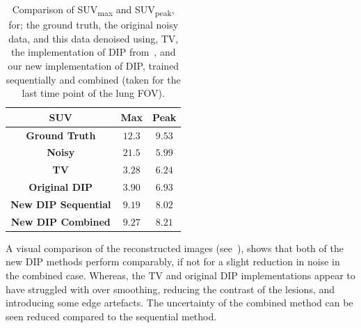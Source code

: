     \begin{table}
        
        \centering
        
        \captionsetup{singlelinecheck=false, justification=centering}
        \caption{
        Comparison of \acrshort{SUV}\textsubscript{max} and \acrshort{SUV}\textsubscript{peak}, for; the ground truth, the original noisy data, and this data denoised using, \gls{TV}, the implementation of \gls{DIP} from~\cite{Gong2019PETPrior}, and our new implementation of \gls{DIP}, trained sequentially and combined (taken for the last time point of the lung \gls{FOV}).}
        
        
        \resizebox*{1.0\linewidth}{!}
        {
            \begin{tabular}{||c|cc||}
                \hline
                \textbf{\acrshort{SUV}}             & \textbf{Max}  & \textbf{Peak} \\
                \hline
                \textbf{Ground Truth}               & $12.3$        & $9.53$ \\
                \hline
                \textbf{Noisy}                      & $21.5$        & $5.99$ \\
                \hline
                \textbf{\gls{TV}}                   & $3.28$        & $6.24$ \\
                \textbf{Original \gls{DIP}}         & $3.90$        & $6.93$ \\
                \hline
                \textbf{New \gls{DIP} Sequential}   & $9.19$        & $8.02$ \\
                \textbf{New \gls{DIP} Combined}     & $9.27$        & $8.21$ \\
                \hline
            \end{tabular}
        }
        \label{tab:suv}
        
    \end{table}
    
    A visual comparison of the reconstructed images (see~), shows that both of the new \gls{DIP} methods perform comparably, if not for a slight reduction in noise in the combined case. Whereas, the \gls{TV} and original \gls{DIP} implementations appear to have struggled with over smoothing, reducing the contrast of the lesions, and introducing some edge artefacts. The uncertainty of the combined method can be seen reduced compared to the sequential method.
    
